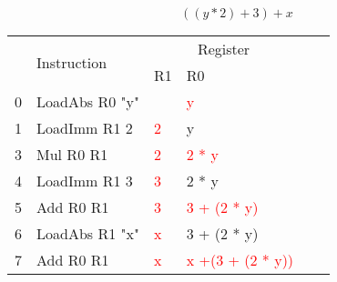 \documentclass{report}
\newcommand{\hot}[1]{\textcolor{red}{#1}}
\begin{document}
\[((y * 2) + 3) + x\]
\begin{center}
	\begin{tabular}{c l | l l l l}
		  & \multirow{2}{*}{Instruction} & \multicolumn{2}{c}{Register}                          \\
		  &                              & R1                           & R0                     \\
		\hline
		0 & LoadAbs R0 "y"               &                              & \hot{y}                \\
		1 & LoadImm R1 2                 & \hot{2}                      & y                      \\
		3 & Mul R0 R1                    & \hot{2}                      & \hot{2 * y}            \\
		4 & LoadImm R1 3                 & \hot{3}                      & 2 * y                  \\
		5 & Add R0 R1                    & \hot{3}                      & \hot{3 + (2 * y)}      \\
		6 & LoadAbs R1 "x"               & \hot{x}                      & 3 + (2 * y)            \\
		7 & Add R0 R1                    & \hot{x}                      & \hot{x +(3 + (2 * y))} \\
	\end{tabular}
\end{center}
\end{document}
